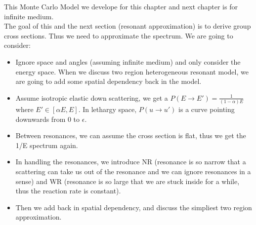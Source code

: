 \documentclass{school-22.211-notes}
\date{February 13, 2012}
\begin{document}
\maketitle


 \label{slowing-down-thermalization}
This Monte Carlo Model we develope for this chapter and next chapter is for infinite medium. \\
The goal of this and the next section (resonant approximation) is to derive group cross sections. Thus we need to approximate the spectrum. We are going to consider: 
\begin{itemize}
\item Ignore space and angles (assuming infinite medium) and only consider the energy space. When we discuss two region heterogeneous resonant model, we are going to add some spatial dependency back in the model. 
\item Assume isotropic elastic down scattering, we get a $P(E\to E') = \frac{1}{(1-\alpha)E}$ where $E' \in [\alpha E, E]$. In lethargy space, $P(u\to u')$ is a curve pointing downwards from $0$ to $\epsilon$. 
\item Between resonances, we can assume the cross section is flat, thus we get the 1/E spectrum again. 
\item In handling the resonances, we introduce NR (resonance is so narrow that a scattering can take us out of the resonance and we can ignore resonances in a sense) and WR (resonance is so large that we are stuck inside for a while, thus the reaction rate is constant). 
\item Then we add back in spatial dependency, and discuss the simpliest two region approximation.
\end{itemize}
\end{document}
